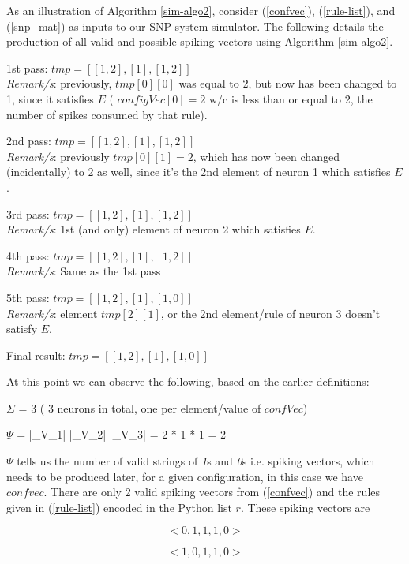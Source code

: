 \documentclass{acm_proc_article-sp}
\begin{document}
As an illustration of Algorithm \ref{sim-algo2}, consider (\ref{confvec}), (\ref{rule-list}), and (\ref{snp_mat}) as inputs to our SNP system simulator. The following details the production of all valid and possible spiking vectors using Algorithm \ref{sim-algo2}.

1st pass:
$tmp = [ [ 1, 2 ], [ 1 ], [ 1, 2 ] ]$\\
\textit{Remark/s}: previously, $tmp [ 0 ][ 0 ]$ was equal to 2,
but now has been changed to 1, since it satisfies $E$
( $configVec[ 0 ] = 2$ w/c is less than or equal to 2, the
number of spikes consumed by that rule).

2nd pass:
$tmp = [ [ 1, 2 ], [ 1 ], [ 1, 2 ] ]$\\
\textit{Remark/s}: previously $tmp[ 0 ][ 1 ] = 2$, which has
now been changed (incidentally) to 2 as well, since
it's the 2nd element of neuron 1 which satisfies $E$.

3rd pass:
$tmp = [ [ 1, 2 ], [ 1 ], [ 1, 2 ] ]$\\
\textit{Remark/s}: 1st (and only) element of neuron 2 which
satisfies $E$.

4th pass:
$tmp = [ [ 1, 2 ], [ 1 ], [ 1, 2 ] ]$\\
\textit{Remark/s}: Same as the 1st pass

5th pass:
$tmp = [ [ 1, 2 ], [ 1 ], [ 1, 0 ] ]$\\
\textit{Remark/s}: element $tmp[ 2 ][ 1 ]$, or the 2nd
element/rule of neuron 3 doesn't satisfy $E$.

Final result:
$tmp = [ [ 1, 2 ], [ 1 ], [ 1, 0 ] ]$

At this point we can observe the following, based on the
earlier definitions:

$\Sigma$ = 3 ( 3 neurons in total, one per element/value of
$confVec$)

$\Psi$ = |\sigma_V_1| |\sigma_V_2| |\sigma_V_3| = 2 * 1 * 1 = 2

$\Psi$ tells us the number of valid strings of \textit{1}s and \textit{0}s i.e.
spiking vectors, which needs to be produced later, for a
given configuration, in this case we have $confvec$. There are only
2 valid spiking vectors from (\ref{confvec}) and the
rules given in (\ref{rule-list}) encoded in the Python list $r$. These spiking vectors are

\begin{equation}\label{sk-211-1}
< 0, 1, 1, 1, 0>
\end{equation}

\begin{equation}\label{sk-211-2}
< 1, 0, 1, 1, 0>
\end{equation}
\end{document}
